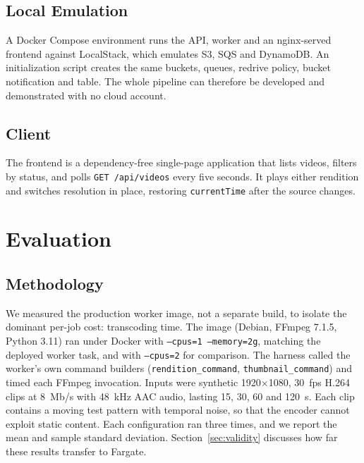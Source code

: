 \documentclass[conference]{IEEEtran}
\begin{document}
\subsection{Local Emulation}
A Docker Compose environment runs the API, worker and an nginx-served frontend against LocalStack, which emulates S3, SQS and DynamoDB. An initialization script creates the same buckets, queues, redrive policy, bucket notification and table. The whole pipeline can therefore be developed and demonstrated with no cloud account.

\subsection{Client}
The frontend is a dependency-free single-page application that lists videos, filters by status, and polls \texttt{GET /api/videos} every five seconds. It plays either rendition and switches resolution in place, restoring \texttt{currentTime} after the source changes.

\section{Evaluation}\label{sec:eval}

\subsection{Methodology}
We measured the production worker image, not a separate build, to isolate the dominant per-job cost: transcoding time. The image (Debian, FFmpeg 7.1.5, Python 3.11) ran under Docker with \texttt{--cpus=1 --memory=2g}, matching the deployed worker task, and with \texttt{--cpus=2} for comparison. The harness called the worker's own command builders (\texttt{rendition\_command}, \texttt{thumbnail\_command}) and timed each FFmpeg invocation. Inputs were synthetic 1920$\times$1080, 30~fps H.264 clips at 8~Mb/s with 48~kHz AAC audio, lasting 15, 30, 60 and 120~s. Each clip contains a moving test pattern with temporal noise, so that the encoder cannot exploit static content. Each configuration ran three times, and we report the mean and sample standard deviation. Section~\ref{sec:validity} discusses how far these results transfer to Fargate.
\end{document}
